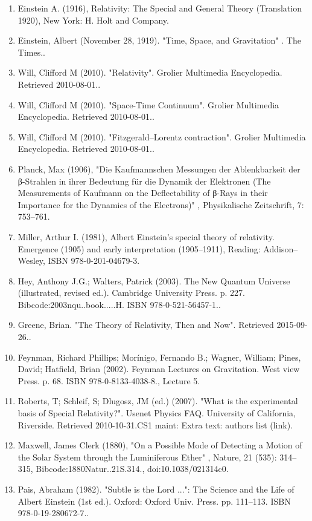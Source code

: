 \begin{enumerate}
\item Einstein A. (1916), Relativity: The Special and General Theory (Translation 1920), New York: H. Holt and Company.
\item Einstein, Albert (November 28, 1919). "Time, Space, and Gravitation" . The Times..
\item Will, Clifford M (2010). "Relativity". Grolier Multimedia Encyclopedia. Retrieved 2010-08-01..
\item Will, Clifford M (2010). "Space-Time Continuum". Grolier Multimedia Encyclopedia. Retrieved 2010-08-01..
\item Will, Clifford M (2010). "Fitzgerald–Lorentz contraction". Grolier Multimedia Encyclopedia. Retrieved 2010-08-01..
\item Planck, Max (1906), "Die Kaufmannschen Messungen der Ablenkbarkeit der β-Strahlen in ihrer Bedeutung für die Dynamik der Elektronen (The Measurements of Kaufmann on the Deflectability of β-Rays in their Importance for the Dynamics of the Electrons)" , Physikalische Zeitschrift, 7: 753–761.
\item Miller, Arthur I. (1981), Albert Einstein's special theory of relativity. Emergence (1905) and early interpretation (1905–1911), Reading: Addison–Wesley, ISBN 978-0-201-04679-3.
\item Hey, Anthony J.G.; Walters, Patrick (2003). The New Quantum Universe (illustrated, revised ed.). Cambridge University Press. p. 227. Bibcode:2003nqu..book.....H. ISBN 978-0-521-56457-1..
\item Greene, Brian. "The Theory of Relativity, Then and Now". Retrieved 2015-09-26..
\item Feynman, Richard Phillips; Morínigo, Fernando B.; Wagner, William; Pines, David; Hatfield, Brian (2002). Feynman Lectures on Gravitation. West view Press. p. 68. ISBN 978-0-8133-4038-8., Lecture 5.
\item Roberts, T; Schleif, S; Dlugosz, JM (ed.) (2007). "What is the experimental basis of Special Relativity?". Usenet Physics FAQ. University of California, Riverside. Retrieved 2010-10-31.CS1 maint: Extra text: authors list (link).
\item Maxwell, James Clerk (1880), "On a Possible Mode of Detecting a Motion of the Solar System through the Luminiferous Ether" , Nature, 21 (535): 314–315, Bibcode:1880Natur..21S.314., doi:10.1038/021314c0.
\item Pais, Abraham (1982). "Subtle is the Lord ...": The Science and the Life of Albert Einstein (1st ed.). Oxford: Oxford Univ. Press. pp. 111–113. ISBN 978-0-19-280672-7..

\end{enumerate}
